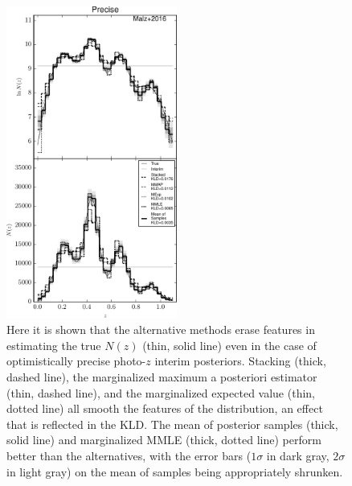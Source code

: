 \begin{figure}
	\includegraphics[width=0.5\textwidth]{figures/chippr/sig1_comps.pdf}
	\caption{Here it is shown that the alternative methods erase features in estimating the true $N(z)$ (thin, solid line) even in the case of optimistically precise photo-$z$ interim posteriors.  
		Stacking (thick, dashed line), the marginalized maximum a posteriori estimator (thin, dashed line), and the marginalized expected value (thin, dotted line) all smooth the features of the distribution, an effect that is reflected in the KLD.  
		The mean of posterior samples (thick, solid line) and marginalized MMLE (thick, dotted line) perform better than the alternatives, with the error bars ($1\sigma$ in dark gray, $2\sigma$ in light gray) on the mean of samples being appropriately shrunken.}
\end{figure}

